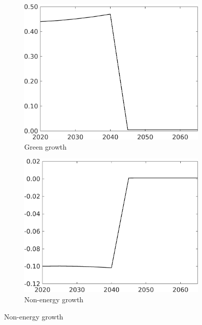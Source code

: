 \begin{figure}[h!!!]
\begin{subfigure}[]{0.32\textwidth}
		\caption{Green growth }
		\includegraphics[width=1\textwidth]{../../codding_model/own_basedOnFried/optimalPol_010922_revision/figures/all_13Sept22_Tplus30/gAg_OPT_COMPtaulPer_regime4_spillover0_knspil1_noskill1_sep0_xgrowth0_PV1_etaa0.79.png}
	\end{subfigure}
	\begin{subfigure}[]{0.32\textwidth}
		\caption{ Non-energy growth }
		\includegraphics[width=1\textwidth]{../../codding_model/own_basedOnFried/optimalPol_010922_revision/figures/all_13Sept22_Tplus30/gAn_OPT_COMPtaulPer_regime4_spillover0_knspil1_noskill1_sep0_xgrowth0_PV1_etaa0.79.png}

\end{subfigure}
\end{figure}
